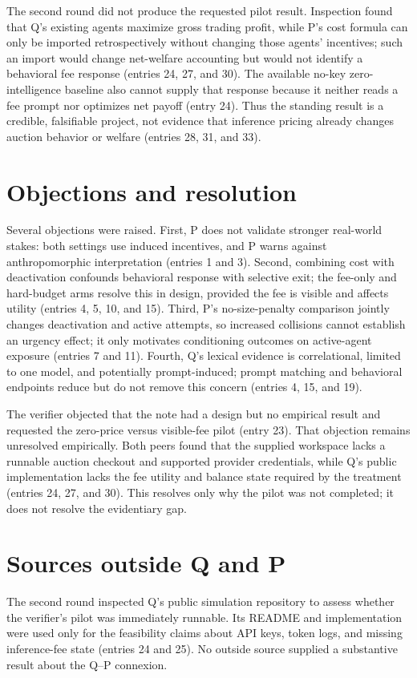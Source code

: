 \documentclass{article}
\begin{document}
The second round did not produce the requested pilot result. Inspection found that Q's existing agents maximize gross trading profit, while P's cost formula can only be imported retrospectively without changing those agents' incentives; such an import would change net-welfare accounting but would not identify a behavioral fee response (entries 24, 27, and 30). The available no-key zero-intelligence baseline also cannot supply that response because it neither reads a fee prompt nor optimizes net payoff (entry 24). Thus the standing result is a credible, falsifiable project, not evidence that inference pricing already changes auction behavior or welfare (entries 28, 31, and 33).

\section*{Objections and resolution}
Several objections were raised. First, P does not validate stronger real-world stakes: both settings use induced incentives, and P warns against anthropomorphic interpretation (entries 1 and 3). Second, combining cost with deactivation confounds behavioral response with selective exit; the fee-only and hard-budget arms resolve this in design, provided the fee is visible and affects utility (entries 4, 5, 10, and 15). Third, P's no-size-penalty comparison jointly changes deactivation and active attempts, so increased collisions cannot establish an urgency effect; it only motivates conditioning outcomes on active-agent exposure (entries 7 and 11). Fourth, Q's lexical evidence is correlational, limited to one model, and potentially prompt-induced; prompt matching and behavioral endpoints reduce but do not remove this concern (entries 4, 15, and 19).

The verifier objected that the note had a design but no empirical result and requested the zero-price versus visible-fee pilot (entry 23). That objection remains unresolved empirically. Both peers found that the supplied workspace lacks a runnable auction checkout and supported provider credentials, while Q's public implementation lacks the fee utility and balance state required by the treatment (entries 24, 27, and 30). This resolves only why the pilot was not completed; it does not resolve the evidentiary gap.

\section*{Sources outside Q and P}
The second round inspected Q's public simulation repository to assess whether the verifier's pilot was immediately runnable. Its README and implementation were used only for the feasibility claims about API keys, token logs, and missing inference-fee state (entries 24 and 25). No outside source supplied a substantive result about the Q--P connexion.
\end{document}

